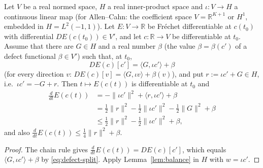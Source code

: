 \begin{Theorem}\label{thm:defect}
Let $V$ be a real normed space, $H$ a real inner-product space and $\iota:V\to H$ a continuous linear map (for Allen--Cahn: the coefficient space $V=\mathbb{R}^{K+1}$ or $H^1$, embedded in $H=L^2(-1,1)$).
Let $E:V\to\mathbb{R}$ be Fr\'echet differentiable at $c(t_0)$ with differential $DE(c(t_0))\in V'$, and let $c:\mathbb{R}\to V$ be differentiable at $t_0$.
Assume that there are $G\in H$ and a real number $\beta$ (the value $\beta=\beta(c')$ of a defect functional $\beta\in V'$) such that, at $t_0$,
\begin{equation}\label{eq:defect-split}
DE(c)[c']=\langle G,\iota c'\rangle+\beta
\end{equation}
(for every direction $v$: $DE(c)[v]=\langle G,\iota v\rangle+\beta(v)$), and put $r:=\iota c'+G\in H$, i.e.\ $\iota c'=-G+r$.
Then $t\mapsto E(c(t))$ is differentiable at $t_0$ and
\begin{equation}\label{eq:defect-id}
\begin{aligned}
\frac{d}{dt}E(c(t)) &= -\|\iota c'\|^2+\langle r,\iota c'\rangle+\beta\\
&=\tfrac12\|r\|^2-\tfrac12\|\iota c'\|^2-\tfrac12\|G\|^2+\beta\\
&\le\tfrac12\|r\|^2-\tfrac12\|\iota c'\|^2+\beta,
\end{aligned}
\end{equation}
and also $\frac{d}{dt}E(c(t))\le\tfrac14\|r\|^2+\beta$.
\end{Theorem}
\begin{proof}
The chain rule gives $\frac{d}{dt}E(c(t))=DE(c)[c']$, which equals $\langle G,\iota c'\rangle+\beta$ by \eqref{eq:defect-split}.
Apply Lemma~\ref{lem:balance} in $H$ with $w=\iota c'$.
\end{proof}

